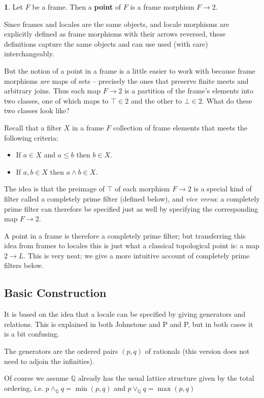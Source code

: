 \documentclass[oneside,english]{amsbook}
\numberwithin{section}{chapter}
\theoremstyle{plain}
\theoremstyle{definition}
\newtheorem{defn}[thm]{\protect\definitionname}
\providecommand{\definitionname}{Definition}
\begin{document}
\begin{defn}
	Let $F$ be a frame. Then a \textbf{point} of $F$ is a frame morphism $F\to 2$.
\end{defn}

Since frames and locales are the same objects, and locale morphisms are explicitly defined as frame morphisms with their arrows reversed, these definitions capture the same objects and can use used (with care) interchangeably. 

But the notion of a point in a frame is a little easier to work with because frame morphisms \emph{are} maps of sets -- precisely the ones that preserve finite meets and arbitrary joins. Thus each map $F\to 2$ is a partition of the frame's elements into two classes, one of which maps to $\top\in 2$ and the other to $\bot\in 2$. What do these two classes look like?

Recall that a filter $X$ in a frame $F$ collection of frame elements that meets the following criteria: 
\begin{itemize} 
	\item If $a\in X$ and $a\le b$ then $b\in X$. 
	\item If $a, b\in X$ then $a\land b\in X$. 
\end{itemize}
The idea is that the preimage of $\top$ of each morphism $F\to 2$ is a special kind of filter called a completely prime filter (defined below), and \emph{vice versa}: a completely prime filter can therefore be specified just as well by specifying the corresponding map $F\to 2$.

A point in a frame is therefore a completely prime filter; but transferring this idea from frames to locales this is just what a classical topological point is: a map $2\to L$. This is very neat; we give a more intuitive account of completely prime filters below.

\subsection{Basic Construction}

It is based on the idea that a locale can be specified by giving generators and relations. This is explained in both Johnstone and P and P, but in both cases it is a bit confusing.

The generators are the ordered pairs $(p, q)$ of rationals (this version does not need to adjoin the infinities). 

Of course we assume $\mathbb{Q}$ already has the usual lattice structure given by the total ordering, i.e. $p\land_\mathbb{Q} q = \min(p, q)$ and $p\lor_\mathbb{Q} q = \max(p, q)$
\end{document}
